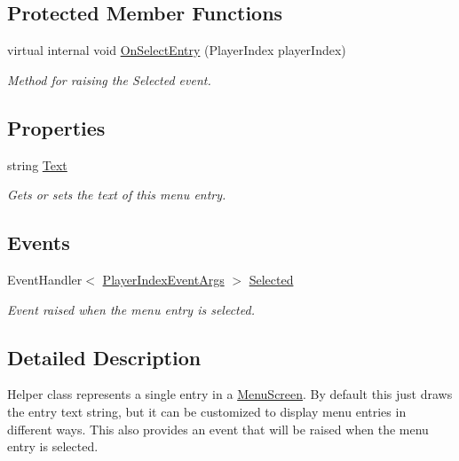 \subsection*{Protected Member Functions}
\begin{DoxyCompactItemize}
\item 
virtual internal void \hyperlink{classCityMania_1_1MenuEntry_ab163a7cb2a760af1007a923cd2bc87ed}{OnSelectEntry} (PlayerIndex playerIndex)
\begin{DoxyCompactList}\small\item\em Method for raising the Selected event. \item\end{DoxyCompactList}\end{DoxyCompactItemize}
\subsection*{Properties}
\begin{DoxyCompactItemize}
\item 
string \hyperlink{classCityMania_1_1MenuEntry_a9acc56b2750d90a7c5c3f190367b803e}{Text}
\begin{DoxyCompactList}\small\item\em Gets or sets the text of this menu entry. \item\end{DoxyCompactList}\end{DoxyCompactItemize}
\subsection*{Events}
\begin{DoxyCompactItemize}
\item 
EventHandler$<$ \hyperlink{classCityMania_1_1PlayerIndexEventArgs}{PlayerIndexEventArgs} $>$ \hyperlink{classCityMania_1_1MenuEntry_a936e132fbdf1e2e598b82ef1b022f96c}{Selected}
\begin{DoxyCompactList}\small\item\em Event raised when the menu entry is selected. \item\end{DoxyCompactList}\end{DoxyCompactItemize}


\subsection{Detailed Description}
Helper class represents a single entry in a \hyperlink{classCityMania_1_1MenuScreen}{MenuScreen}. By default this just draws the entry text string, but it can be customized to display menu entries in different ways. This also provides an event that will be raised when the menu entry is selected. 

